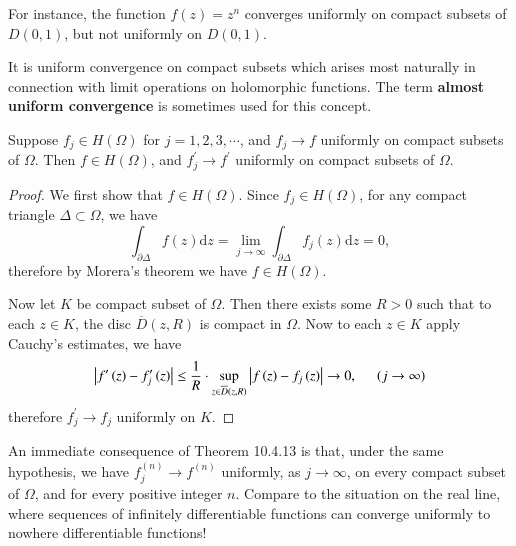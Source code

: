 For instance, the function $f(z)=z^n$ converges uniformly on compact subsets of $D(0,1)$, but not uniformly on $D(0,1)$.\par
It is uniform convergence on compact subsets which arises most naturally in connection with limit operations on holomorphic functions. The term \textbf{almost uniform convergence} is sometimes used for this concept.
\begin{theorem}
Suppose $f_j\in H(\Omega)$ for $j=1,2,3,\cdots$, and $f_j\to f$ uniformly on compact subsets of $\Omega$. Then $f\in H(\Omega)$, and $f^\prime_j\to f^\prime$ uniformly on compact subsets of $\Omega$.
\end{theorem}
\begin{proof}
We first show that $f\in H(\Omega)$. Since $f_j\in H(\Omega)$, for any compact triangle $\Delta\subset\Omega$, we have 
$$
\int_{\partial \Delta}{f\left( z \right) \mathrm{d}z}=\lim_{j\rightarrow \infty} \int_{\partial \Delta}{f_j\left( z \right) \mathrm{d}z}=0,
$$
therefore by Morera's theorem we have $f\in H(\Omega)$.\par
Now let $K$ be compact subset of $\Omega$. Then there exists some $R>0$ such that to each $z\in K$, the disc $\overline{D}(z,R)$ is compact in $\Omega$. Now to each $z\in K$ apply Cauchy's estimates, we have 
$$
\left| f^{\prime}\left( z \right) -f_{j}^{\prime}\left( z \right) \right|\le \frac{1}{R}\cdot \mathop {\mathrm{sup}} \limits_{z\in \overline{D}\left( z,R \right)}\left| f\left( z \right) -f_j\left( z \right) \right|\rightarrow 0,\hspace{0.5cm}\left( j\rightarrow \infty \right) 
$$
therefore $f_j^\prime\to f_j$ uniformly on $K$.
\end{proof}
An immediate consequence of Theorem 10.4.13 is that, under the same hypothesis, we have $f_j^{(n)}\to f^{(n)}$ uniformly, as $j\to\infty$, on every compact subset of $\Omega$, and for every positive integer $n$. Compare to the situation on the real line, where sequences of infinitely differentiable functions can converge uniformly to nowhere differentiable functions!
